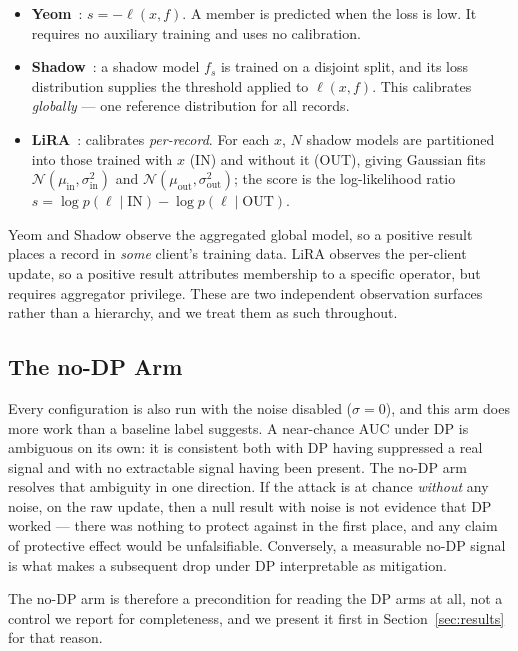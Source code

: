 \begin{itemize}
\item \textbf{Yeom}~\cite{yeom2018privacy}: $s = -\ell(x,f)$. A member is
predicted when the loss is low. It requires no auxiliary training and
uses no calibration.

\item \textbf{Shadow}~\cite{shokri2017membership,salem2019mlleaks}: a
shadow model $f_s$ is trained on a disjoint split, and its loss
distribution supplies the threshold applied to $\ell(x,f)$. This
calibrates \emph{globally} --- one reference distribution for all records.

\item \textbf{LiRA}~\cite{carlini2022membership}: calibrates
\emph{per-record}. For each $x$, $N$ shadow models are partitioned into
those trained with $x$ (IN) and without it (OUT), giving Gaussian fits
$\mathcal{N}(\mu_{\text{in}}, \sigma_{\text{in}}^2)$ and
$\mathcal{N}(\mu_{\text{out}}, \sigma_{\text{out}}^2)$; the score is the
log-likelihood ratio
$s = \log p(\ell \mid \text{IN}) - \log p(\ell \mid \text{OUT})$.
\end{itemize}

Yeom and Shadow observe the aggregated global model, so a positive result
places a record in \emph{some} client's training data. LiRA observes the
per-client update, so a positive result attributes membership to a
specific operator, but requires aggregator privilege. These are two
independent observation surfaces rather than a hierarchy, and we treat
them as such throughout.

\subsection{The no-DP Arm}
\label{sec:prelim-nodp}

Every configuration is also run with the noise disabled ($\sigma = 0$),
and this arm does more work than a baseline label suggests. A near-chance
AUC under DP is ambiguous on its own: it is consistent both with DP having
suppressed a real signal and with no extractable signal having been
present. The no-DP arm resolves that ambiguity in one direction. If the
attack is at chance \emph{without} any noise, on the raw update, then a
null result with noise is not evidence that DP worked --- there was
nothing to protect against in the first place, and any claim of protective
effect would be unfalsifiable. Conversely, a measurable no-DP signal is
what makes a subsequent drop under DP interpretable as mitigation.

The no-DP arm is therefore a precondition for reading the DP arms at all,
not a control we report for completeness, and we present it first in
Section~\ref{sec:results} for that reason.
